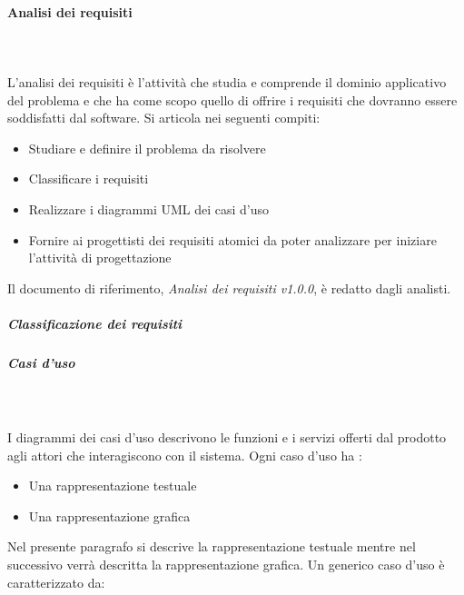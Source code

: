 \documentclass[../norme-di-progetto.tex]{subfiles}
\begin{document}
\paragraph{Analisi dei requisiti}\mbox{}\\
\label{par:analisi dei requisiti}
\\L'analisi dei requisiti è l'attività che studia e comprende il dominio applicativo del problema e che ha come scopo quello di offrire i requisiti che dovranno essere soddisfatti dal software. Si articola nei seguenti compiti:
\begin{itemize}
	\item Studiare e definire il problema da risolvere
	\item Classificare i requisiti
	\item Realizzare i diagrammi UML dei casi d'uso
	\item Fornire ai progettisti dei requisiti atomici da poter analizzare per iniziare l'attività di progettazione
\end{itemize} 
Il documento di riferimento, \textit{Analisi dei requisiti v1.0.0}, è redatto dagli analisti.
\subparagraph{Classificazione dei requisiti}
\label{subp:classificazione dei requisiti}
\subparagraph{Casi d'uso}\mbox{}\\
\label{subp:casi d'uso}
\\ I diagrammi dei casi d'uso descrivono le funzioni e i servizi offerti dal prodotto agli attori che interagiscono con il sistema. Ogni caso d'uso ha :
\begin{itemize}
	\item Una rappresentazione testuale
	\item Una rappresentazione grafica
\end{itemize}
Nel presente paragrafo si descrive la rappresentazione testuale mentre nel successivo verrà descritta la rappresentazione grafica. Un generico caso d'uso è caratterizzato da:
\end{document}
